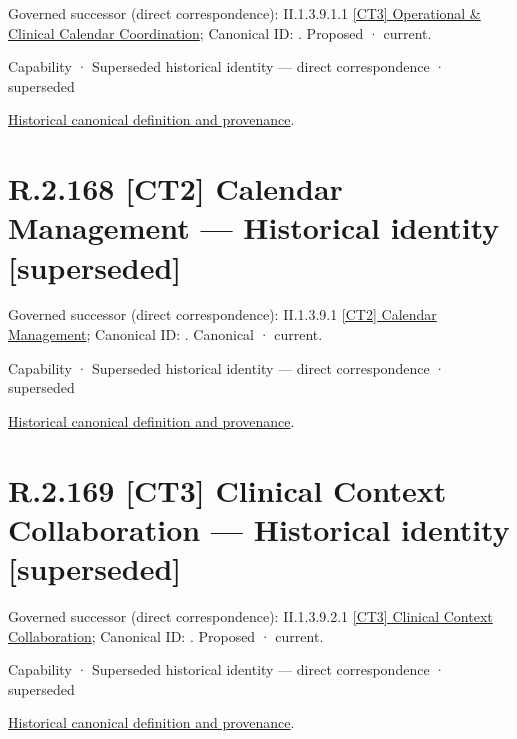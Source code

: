 {\small Governed successor (direct correspondence): II.1.3.9.1.1 \hyperref[element:f6d8f1310ba543f69e8b57bf05603db3]{[CT3] Operational \& Clinical Calendar Coordination}; Canonical ID: \texttt{}. Proposed · current.}\par
\label{element:c0f6e5f7f5a94d1580fa6e0e8b82c93a}
{\small Capability · Superseded historical identity — direct correspondence · superseded}\par
\href{../../../../continuum/strategy/capability/c0f6e5f7f5a94d1580fa6e0e8b82c93a.md}{Historical canonical definition and provenance}.\par
\section*{R.2.168 [CT2] Calendar Management — Historical identity [superseded]}
\label{navigation:R.2.168}

{\small Governed successor (direct correspondence): II.1.3.9.1 \hyperref[element:7669036f7e6749219412fc64df5f7064]{[CT2] Calendar Management}; Canonical ID: \texttt{}. Canonical · current.}\par
\label{element:8b42aac6083441caa78b59f5e62eebd9}
{\small Capability · Superseded historical identity — direct correspondence · superseded}\par
\href{../../../../continuum/strategy/capability/8b42aac6083441caa78b59f5e62eebd9.md}{Historical canonical definition and provenance}.\par
\section*{R.2.169 [CT3] Clinical Context Collaboration — Historical identity [superseded]}
\label{navigation:R.2.169}

{\small Governed successor (direct correspondence): II.1.3.9.2.1 \hyperref[element:f11617eed6ff4d6fa237644ec95b28b2]{[CT3] Clinical Context Collaboration}; Canonical ID: \texttt{}. Proposed · current.}\par
\label{element:750ef0d8e1504a8e9a1fde9bf13a6d0c}
{\small Capability · Superseded historical identity — direct correspondence · superseded}\par
\href{../../../../continuum/strategy/capability/750ef0d8e1504a8e9a1fde9bf13a6d0c.md}{Historical canonical definition and provenance}.\par
